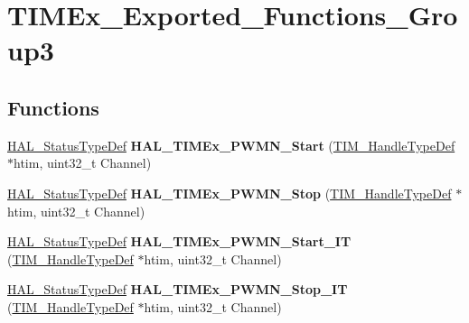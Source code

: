 \hypertarget{group___t_i_m_ex___exported___functions___group3}{}\section{T\+I\+M\+Ex\+\_\+\+Exported\+\_\+\+Functions\+\_\+\+Group3}
\label{group___t_i_m_ex___exported___functions___group3}
\subsection*{Functions}
\begin{DoxyCompactItemize}
\item 
\hyperlink{stm32f4xx__hal__def_8h_a63c0679d1cb8b8c684fbb0632743478f}{H\+A\+L\+\_\+\+Status\+Type\+Def} {\bfseries H\+A\+L\+\_\+\+T\+I\+M\+Ex\+\_\+\+P\+W\+M\+N\+\_\+\+Start} (\hyperlink{struct_t_i_m___handle_type_def}{T\+I\+M\+\_\+\+Handle\+Type\+Def} $\ast$htim, uint32\+\_\+t Channel)\hypertarget{group___t_i_m_ex___exported___functions___group3_ga4f2b0bb4b66a5acd76eac4e8d32cc498}{}\label{group___t_i_m_ex___exported___functions___group3_ga4f2b0bb4b66a5acd76eac4e8d32cc498}

\item 
\hyperlink{stm32f4xx__hal__def_8h_a63c0679d1cb8b8c684fbb0632743478f}{H\+A\+L\+\_\+\+Status\+Type\+Def} {\bfseries H\+A\+L\+\_\+\+T\+I\+M\+Ex\+\_\+\+P\+W\+M\+N\+\_\+\+Stop} (\hyperlink{struct_t_i_m___handle_type_def}{T\+I\+M\+\_\+\+Handle\+Type\+Def} $\ast$htim, uint32\+\_\+t Channel)\hypertarget{group___t_i_m_ex___exported___functions___group3_ga0f2e27f3fb6d8f42d998e2071e5f0482}{}\label{group___t_i_m_ex___exported___functions___group3_ga0f2e27f3fb6d8f42d998e2071e5f0482}

\item 
\hyperlink{stm32f4xx__hal__def_8h_a63c0679d1cb8b8c684fbb0632743478f}{H\+A\+L\+\_\+\+Status\+Type\+Def} {\bfseries H\+A\+L\+\_\+\+T\+I\+M\+Ex\+\_\+\+P\+W\+M\+N\+\_\+\+Start\+\_\+\+IT} (\hyperlink{struct_t_i_m___handle_type_def}{T\+I\+M\+\_\+\+Handle\+Type\+Def} $\ast$htim, uint32\+\_\+t Channel)\hypertarget{group___t_i_m_ex___exported___functions___group3_ga82f0b53f6b10e6aafc6835178662c488}{}\label{group___t_i_m_ex___exported___functions___group3_ga82f0b53f6b10e6aafc6835178662c488}

\item 
\hyperlink{stm32f4xx__hal__def_8h_a63c0679d1cb8b8c684fbb0632743478f}{H\+A\+L\+\_\+\+Status\+Type\+Def} {\bfseries H\+A\+L\+\_\+\+T\+I\+M\+Ex\+\_\+\+P\+W\+M\+N\+\_\+\+Stop\+\_\+\+IT} (\hyperlink{struct_t_i_m___handle_type_def}{T\+I\+M\+\_\+\+Handle\+Type\+Def} $\ast$htim, uint32\+\_\+t Channel)\hypertarget{group___t_i_m_ex___exported___functions___group3_ga13848e20df29fa552ef4f5b69fef20a6}{}\label{group___t_i_m_ex___exported___functions___group3_ga13848e20df29fa552ef4f5b69fef20a6}


\end{DoxyCompactItemize}
